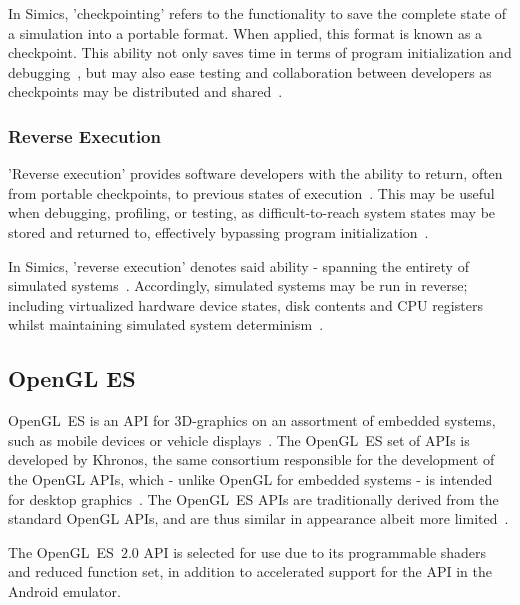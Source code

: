 In Simics, 'checkpointing' refers to the functionality to save the complete state of a simulation into a portable format.
When applied, this format is known as a checkpoint.
This ability not only  saves time in terms of program initialization and debugging~, but may also ease testing and collaboration between developers as checkpoints may be distributed and shared~.

\subsubsection{Reverse Execution}
\label{sec:simics_reverseexecution}
'Reverse execution' provides software developers with the ability to return, often from portable checkpoints, to previous states of execution~.
This may be useful when debugging, profiling, or testing, as difficult-to-reach system states may be stored and returned to, effectively bypassing program initialization~.

In Simics, 'reverse execution' denotes said ability - spanning the entirety of simulated systems~.
Accordingly, simulated systems may be run in reverse; including virtualized hardware device states, disk contents and CPU registers~ whilst maintaining simulated system determinism~.

\subsection{OpenGL ES}
\label{sec:backgroundandrelatedwork_opengles}
OpenGL~ES is an API for 3D-graphics on an assortment of embedded systems, such as mobile devices or vehicle displays~.
The OpenGL~ES set of APIs is developed by Khronos, the same consortium responsible for the development of the OpenGL APIs, which - unlike OpenGL for embedded systems - is intended for desktop graphics~.
The OpenGL~ES APIs are traditionally derived from the standard OpenGL APIs, and are thus similar in appearance albeit more limited~.

The OpenGL~ES~$2.0$ API is selected for use due to its programmable shaders and reduced function set, in addition to accelerated support for the API in the Android emulator.

